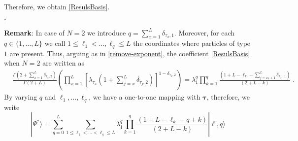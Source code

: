 \documentclass[10pt]{article}
\numberwithin{equation}{section}
\numberwithin{equation}{subsection}
\newcommand{\dt}{\;.}
\begin{document}
Therefore, we obtain \eqref{ResulsBasis}.
\begin{flushright}
	$\square$
\end{flushright}
\textbf{Remark}: In case of $N=2$ we introduce $q=\sum_{x=1}^{L}\delta_{\tau_{x},1}$. Moreover, for each $q\in \{1,\ldots,L\}$ we call $1\leq\ell_{1}<\ldots,\ell_{q}\leq L$ the coordinates where particles of type $1$ are present. Thus, arguing as in \eqref{remove-exponent}, the coefficient \eqref{ResulsBasis} when $N=2$ are written as
\begin{align}
	&\frac{\Gamma\left(2+\sum_{x=1}^{L}\delta_{\tau_{x},2}\right)}{\Gamma\left(2+L\right)}\left(\prod_{x=1}^{L}\left[\lambda_{\tau_{x}}\left(1+\sum_{j=x}^{L}\delta_{\tau_{j},2}\right)\right]^{1-\delta_{\tau_{x},2}}\right)%
	=\lambda_{1}^{q}\prod_{k=1}^{q}\frac{\left(1+L-\ell_{k}-\sum_{j=x_{k}+1}^{L}\delta_{\tau_{x_{j}},1}\right)}{(2+L-k)}\dt
\end{align}
By varying $q$ and $\ell_{1},\ldots,\ell_{q}$, we have a one-to-one mapping with $\bm{\tau}$, therefore, we write 
\begin{equation}
	|\Psi^{''}\rangle=\sum_{q=0}^{L}\sum_{1\leq \ell_{1}<\ldots<\ell_{q}\leq L}\lambda_{1}^{q}\prod_{k=1}^{q}\frac{\left(1+L-\ell_{k}-q+k\right)}{(2+L-k)}|\bm{\ell},q\rangle
\end{equation}
\end{document}
